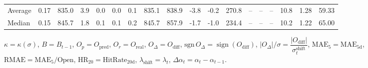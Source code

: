 \begin{threeparttable}
{\begin{tabular}{lrrrrrrrrrrrrrrrrr}
Average &     0.17 & 835.0 &               3.9 &               0.0 &                0.0 &                0.1 & 835.1 & 838.9 &       -3.8 &                     -0.2 &               270.8 &         -- &        -- &             -- &             10.8 &            1.28 &                  59.33 \\
 Median &     0.15 & 845.7 &               1.8 &               0.1 &                0.1 &                0.2 & 845.7 & 857.9 &       -1.7 &                     -1.0 &               234.4 &         -- &        -- &             -- &             10.2 &            1.22 &                  65.00 \\
\bottomrule
\end{tabular}
}
\begin{tablenotes}\footnotesize
\item $\kappa=\kappa(\sigma)$, $B=B_{t-1}$, $O_p=O_{\text{pred}}$, $O_r=O_{\text{real}}$, $O_\Delta=O_{\text{diff}}$, $\mathrm{sgn}\,O_\Delta=\operatorname{sign}(O_{\text{diff}})$, $|O_\Delta|/\sigma=\dfrac{|O_{\text{diff}}|}{\sigma_t^{\text{shift}}}$, $\mathrm{MAE}_5=\mathrm{MAE}_{5\text{d}}$, $\mathrm{RMAE}= \mathrm{MAE}_5 / \text{Open}$, $\mathrm{HR}_{20}=\mathrm{HitRate}_{20\text{d}}$, 
$\lambda_{\text{shift}}=\lambda_t$, 
$\Delta\alpha_t=\alpha_t-\alpha_{t-1}$.
\end{tablenotes}
\end{threeparttable}
\endgroup

